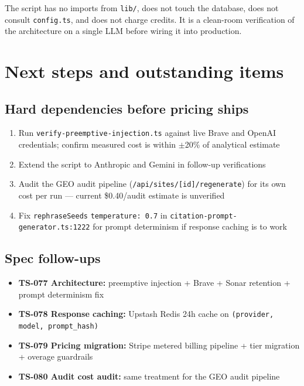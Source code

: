 \documentclass[11pt,letterpaper]{article}
\begin{document}
The script has no imports from \texttt{lib/}, does not touch the database,
does not consult \texttt{config.ts}, and does not charge credits. It is a
clean-room verification of the architecture on a single LLM before wiring
it into production.

\section{Next steps and outstanding items}

\subsection{Hard dependencies before pricing ships}

\begin{enumerate}[nosep]
  \item Run \texttt{verify-preemptive-injection.ts} against live Brave and
    OpenAI credentials; confirm measured cost is within $\pm$20\% of analytical estimate
  \item Extend the script to Anthropic and Gemini in follow-up verifications
  \item Audit the GEO audit pipeline (\texttt{/api/sites/[id]/regenerate}) for
    its own cost per run --- current \$0.40/audit estimate is unverified
  \item Fix \texttt{rephraseSeeds} \texttt{temperature: 0.7} in
    \texttt{citation-prompt-generator.ts:1222} for prompt determinism if
    response caching is to work
\end{enumerate}

\subsection{Spec follow-ups}

\begin{itemize}[nosep]
  \item \textbf{TS-077 Architecture:} preemptive injection + Brave + Sonar retention + prompt determinism fix
  \item \textbf{TS-078 Response caching:} Upstash Redis 24h cache on \texttt{(provider, model, prompt\_hash)}
  \item \textbf{TS-079 Pricing migration:} Stripe metered billing pipeline + tier migration + overage guardrails
  \item \textbf{TS-080 Audit cost audit:} same treatment for the GEO audit pipeline
\end{itemize}
\end{document}
